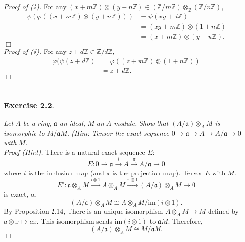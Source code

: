 \documentclass{article}
\begin{document}
\emph{Proof of (4).}
For any $(x + m\mathbb{Z}) \otimes (y + n\mathbb{Z}) \in
(\mathbb{Z}/m\mathbb{Z}) \otimes_{\mathbb{Z}} (\mathbb{Z}/n\mathbb{Z})$,
\begin{align*}
  \psi(\varphi((x + m\mathbb{Z}) \otimes (y + n\mathbb{Z})))
  &= \psi(xy + d\mathbb{Z}) \\
  &= (xy + m\mathbb{Z}) \otimes (1 + n\mathbb{Z}) \\
  &= (x + m\mathbb{Z}) \otimes (y + n\mathbb{Z}).
\end{align*}
$\Box$ \\



\emph{Proof of (5).}
For any $z + d\mathbb{Z} \in \mathbb{Z}/d\mathbb{Z}$,
\begin{align*}
  \varphi(\psi(z + d\mathbb{Z})
  &= \varphi((z + m\mathbb{Z}) \otimes (1 + n\mathbb{Z})) \\
  &= z + d\mathbb{Z}.
\end{align*}
$\Box$ \\\\






\subsubsection*{Exercise 2.2.}
\emph{Let $A$ be a ring, $\mathfrak{a}$ an ideal, $M$ an $A$-module.
Show that $(A/\mathfrak{a}) \otimes_A M$ is isomorphic to $M/\mathfrak{a}M$.
(Hint: Tensor the exact sequence
$0
\rightarrow \mathfrak{a}
\rightarrow A
\rightarrow A/\mathfrak{a}
\rightarrow 0$ with $M$.} \\



\emph{Proof (Hint).}
There is a natural exact sequence $E$:
\[
  E: 0
  \rightarrow \mathfrak{a}
  \xrightarrow{i} A
  \xrightarrow{\pi} A/\mathfrak{a}
  \rightarrow 0
\]
where $i$ is the inclusion map (and $\pi$ is the projection map).
Tensor $E$ with $M$:
$$E':
\mathfrak{a} \otimes_{A} M
\xrightarrow{i \otimes 1} A \otimes_{A} M
\xrightarrow{\pi \otimes 1} (A/\mathfrak{a}) \otimes_{A} M
\rightarrow 0$$
is exact, or
$$(A/\mathfrak{a}) \otimes_{A} M \cong A \otimes_{A} M/\text{im}(i \otimes 1).$$
By Proposition 2.14,
There is an unique isomorphism $A \otimes_{A} M \to M$ defined by
$a \otimes x \mapsto ax$.
This isomorphism sends $\text{im}(i \otimes 1)$ to $\mathfrak{a}M$.
Therefore,
$$
(A/\mathfrak{a}) \otimes_{A} M \cong M/\mathfrak{a}M.$$
$\Box$ \\
\end{document}
